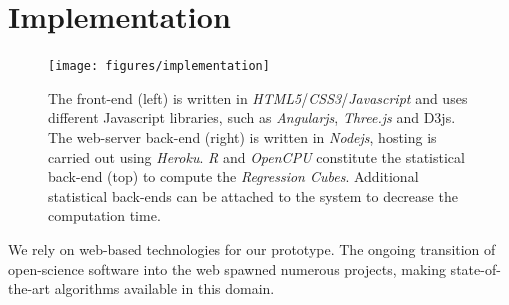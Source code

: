 \documentclass[journal]{style/vgtc} 			          %
\newcommand{\com}[1]{\textcolor{orange}{\uline{#1}}}
\begin{document}

\section{Implementation} \label{implementation}
\begin{figure}[htb]
 \centering
 \texttt{[image: figures/implementation]}
 \caption{
 The front-end (left) is written in \emph{HTML5}/\emph{CSS3}/\emph{Javascript} and uses different Javascript libraries, such as \emph{Angularjs}, \emph{Three.js} and D3js.
 The web-server back-end (right) is written in \emph{Nodejs}, hosting is carried out using \emph{Heroku}.
 \emph{R} and \emph{OpenCPU} constitute the statistical back-end (top) to compute the \emph{Regression Cubes}.
 Additional statistical back-ends can be attached to the system to decrease the computation time.
 }
  \label{fig:Implementation}
\end{figure}
We rely on web-based technologies for our prototype.
The ongoing transition of open-science software into the web spawned numerous projects, making state-of-the-art algorithms available in this domain.
\end{document}

